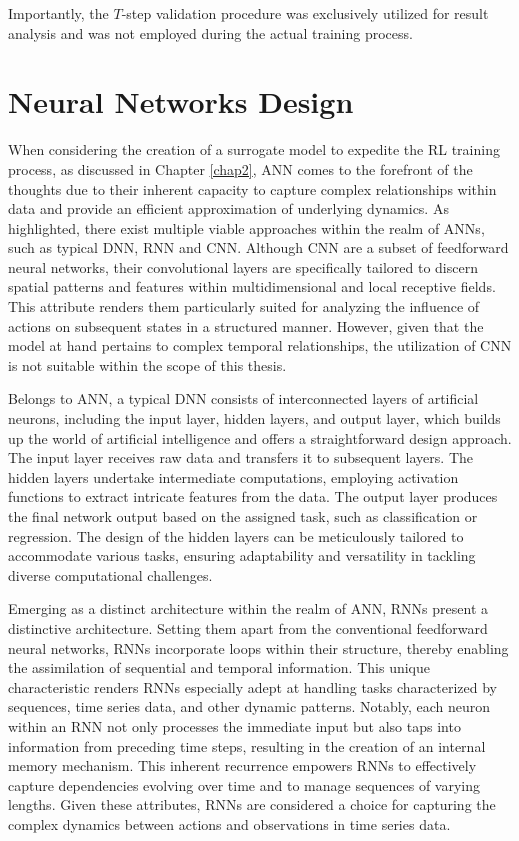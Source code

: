 Importantly, the $T$-step validation procedure was exclusively utilized for result analysis and was not employed during the actual training process.

\section{Neural Networks Design}
\label{sec:NN_design}
When considering the creation of a surrogate model to expedite the RL training process, as discussed in Chapter \ref{chap2}, \ac{ANN} comes to the forefront of the thoughts due to their inherent capacity to capture complex relationships within data and provide an efficient approximation of underlying dynamics. As highlighted, there exist multiple viable approaches within the realm of \ac{ANN}s, such as typical \ac{DNN}, \ac{RNN} and \ac{CNN}. Although \ac{CNN}  are a subset of feedforward neural networks, their convolutional layers are specifically tailored to discern spatial patterns and features within multidimensional and local receptive fields. This attribute renders them particularly suited for analyzing the influence of actions on subsequent states in a structured manner. However, given that the model at hand pertains to complex temporal relationships, the utilization of \ac{CNN} is not suitable within the scope of this thesis.

Belongs to \ac{ANN}, a typical \ac{DNN} consists of interconnected layers of artificial neurons, including the input layer, hidden layers, and output layer, which builds up the world of artificial intelligence and offers a straightforward design approach. The input layer receives raw data and transfers it to subsequent layers. The hidden layers undertake intermediate computations, employing activation functions to extract intricate features from the data. The output layer produces the final network output based on the assigned task, such as classification or regression. The design of the hidden layers can be meticulously tailored to accommodate various tasks, ensuring adaptability and versatility in tackling diverse computational challenges. 

Emerging as a distinct architecture within the realm of \ac{ANN}, \ac{RNN}s present a distinctive architecture. Setting them apart from the conventional feedforward neural networks, \ac{RNN}s incorporate loops within their structure, thereby enabling the assimilation of sequential and temporal information. This unique characteristic renders \ac{RNN}s especially adept at handling tasks characterized by sequences, time series data, and other dynamic patterns. Notably, each neuron within an \ac{RNN} not only processes the immediate input but also taps into information from preceding time steps, resulting in the creation of an internal memory mechanism. This inherent recurrence empowers \ac{RNN}s to effectively capture dependencies evolving over time and to manage sequences of varying lengths. Given these attributes, \ac{RNN}s are considered a choice for capturing the complex dynamics between actions and observations in time series data.

